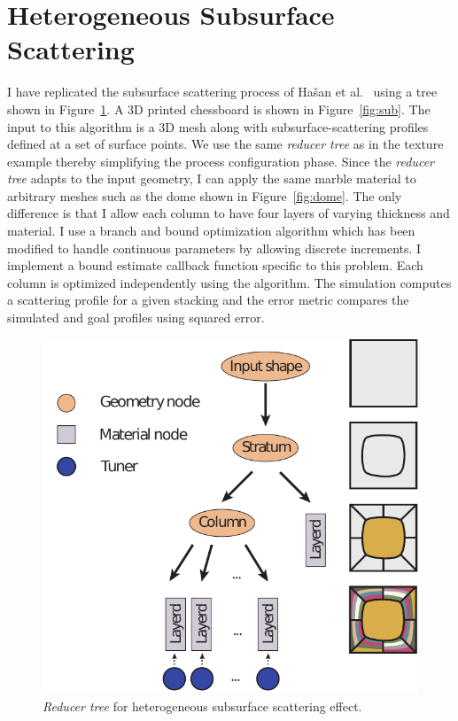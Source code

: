\section{Heterogeneous Subsurface Scattering}
I have replicated the subsurface scattering process of Ha\v{s}an et al.~ using a tree
shown in Figure~\ref{fig:treeSubs}. A 3D printed chessboard is shown in Figure~\ref{fig:sub}.
The input to this algorithm is a 3D mesh along with subsurface-scattering profiles defined
at a set of surface points.
We use the same \emph{reducer tree} as in the texture example thereby simplifying the process configuration phase.
Since the \emph{reducer tree} adapts to the input geometry, I can apply the same marble material to arbitrary
meshes such as the dome shown in Figure~\ref{fig:dome}.
The only difference is that I allow each column to have four layers of varying thickness and material.
I use a branch and bound optimization algorithm which has been modified to handle continuous parameters by allowing discrete increments.
I implement a bound estimate callback function specific to this problem.
Each column is optimized independently using the algorithm. 
The simulation computes a scattering profile for a given stacking
and the error metric compares the simulated and goal profiles using squared error.
\begin{figure}[h]
\centering
\includegraphics[scale=0.7]{figure/treeSubs.pdf}
\caption{
	\emph{Reducer tree} for heterogeneous subsurface scattering effect.}
\label{fig:treeSubs}
\end{figure}

